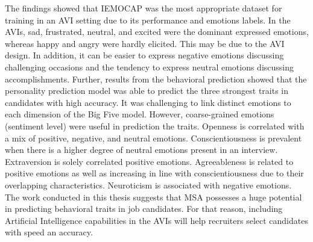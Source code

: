 The findings showed that IEMOCAP was the most appropriate dataset for training in an AVI setting due to its performance and emotions labels. In the AVIs, sad, frustrated, neutral, and excited were the dominant expressed emotions, whereas happy and angry were hardly elicited. This may be due to the AVI design. In addition, it can be easier to express negative emotions discussing challenging occasions and the tendency to express neutral emotions discussing accomplishments. Further, results from the behavioral prediction showed that the personality prediction model was able to predict the three strongest traits in candidates with high accuracy. It was challenging to link distinct emotions to each dimension of the Big Five model. However, coarse-grained emotions (sentiment level) were useful in prediction the traits. Openness is correlated with a mix of positive, negative, and neutral emotions. Conscientiousness is prevalent when there is a higher degree of neutral emotions present in an interview. Extraversion is solely correlated positive emotions. Agreeableness is related to positive emotions as well as increasing in line with conscientiousness due to their overlapping characteristics. Neuroticism is associated with negative emotions. \\

The work conducted in this thesis suggests that MSA possesses a huge potential in predicting behavioral traits in job candidates. For that reason, including Artificial Intelligence capabilities in the AVIs will help recruiters select candidates with speed an accuracy. 

